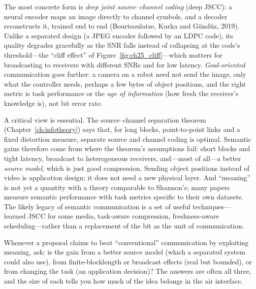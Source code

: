 The most concrete form is \emph{deep joint source--channel coding} (deep JSCC): a neural encoder maps
an image directly to channel symbols, and a decoder reconstructs it, trained end to end
(Bourtsoulatze, Kurka and G\"und\"uz, 2019). Unlike a separated design (a JPEG encoder followed by an
LDPC code), its quality degrades gracefully as the SNR falls instead of collapsing at the code's
threshold---the ``cliff effect'' of Figure~\ref{fig:ch25_cliff}---which matters for broadcasting to
receivers with different SNRs and for low latency. \emph{Goal-oriented} communication goes further: a
camera on a robot need not send the image, only what the controller needs, perhaps a few bytes of
object positions, and the right metric is task performance or the \emph{age of information} (how
fresh the receiver's knowledge is), not bit error rate.

A critical view is essential. The source--channel separation theorem
(Chapter~\ref{ch:infotheory}) says that, for long blocks, point-to-point links and a fixed distortion
measure, separate source and channel coding is optimal. Semantic gains therefore come from where the
theorem's assumptions fail: short blocks and tight latency, broadcast to heterogeneous receivers,
and---most of all---a better \emph{source model}, which is just good compression. Sending object
positions instead of video is application design; it does not need a new physical layer. And
``meaning'' is not yet a quantity with a theory comparable to Shannon's; many papers measure semantic
performance with task metrics specific to their own datasets. The likely legacy of semantic
communication is a set of useful techniques---learned JSCC for some media, task-aware compression,
freshness-aware scheduling---rather than a replacement of the bit as the unit of communication.


\begin{keyidea}
Whenever a proposal claims to beat ``conventional'' communication by exploiting meaning, ask: is the
gain from a better source model (which a separated system could also use), from finite-blocklength or
broadcast effects (real but bounded), or from changing the task (an application decision)? The
answers are often all three, and the size of each tells you how much of the idea belongs in the air
interface.
\end{keyidea}

